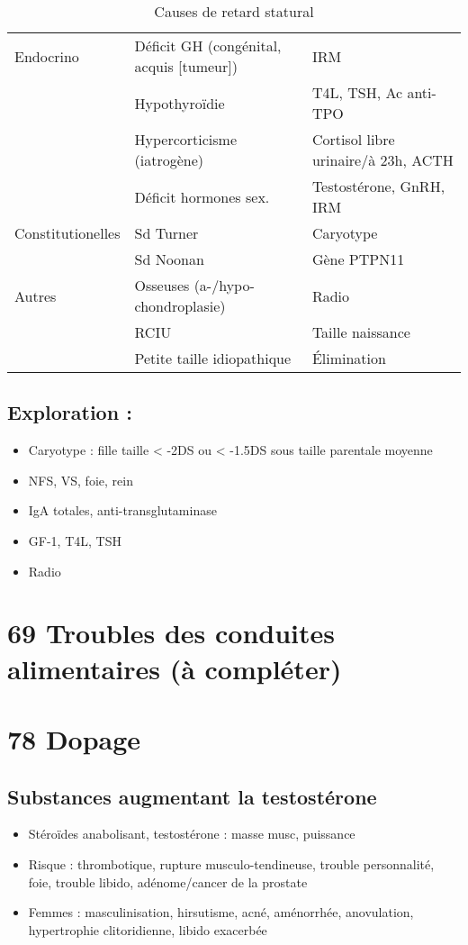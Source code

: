 \documentclass{book}
\begin{document}
\begin{table}[htbp]
\caption{\label{tab:orgf05fdd0}
Causes de retard statural}
\centering
\begin{tabular}{lll}
\toprule
Endocrino & Déficit GH (congénital, acquis [tumeur]) & IRM\\
 & Hypothyroïdie & T4L, TSH, Ac anti-TPO\\
 & Hypercorticisme (iatrogène) & Cortisol libre urinaire/à 23h, ACTH\\
 & Déficit hormones sex. & Testostérone, GnRH, IRM\\
\midrule
Constitutionelles & Sd Turner & Caryotype\\
 & Sd Noonan & Gène PTPN11\\
\midrule
Autres & Osseuses (a-/hypo-chondroplasie) & Radio\\
 & RCIU & Taille naissance\\
 & Petite taille idiopathique & Élimination\\
\bottomrule
\end{tabular}
\end{table}


\subsection{Exploration :}
\label{sec:orgc5c400f}
\begin{itemize}
\item Caryotype : fille taille < -2DS ou < -1.5DS sous taille parentale moyenne
\item NFS, VS, foie, rein
\item IgA totales, anti-transglutaminase
\item GF-1, T4L, TSH
\item Radio
\end{itemize}

\section{69 \textdagger{} Troubles des conduites alimentaires (à compléter)}
\label{sec:orgc3963af}
\section{78 \textdagger{} Dopage}
\label{sec:org14b189c}
\subsection{Substances augmentant la testostérone}
\label{sec:org1758336}
\begin{itemize}
\item Stéroïdes anabolisant, testostérone : \inc masse musc, puissance
\item Risque : thrombotique, rupture musculo-tendineuse, trouble personnalité, foie, trouble libido, adénome/cancer de la prostate
\item Femmes : masculinisation, hirsutisme, acné, aménorrhée, anovulation, hypertrophie clitoridienne, libido exacerbée
\end{itemize}
\end{document}

